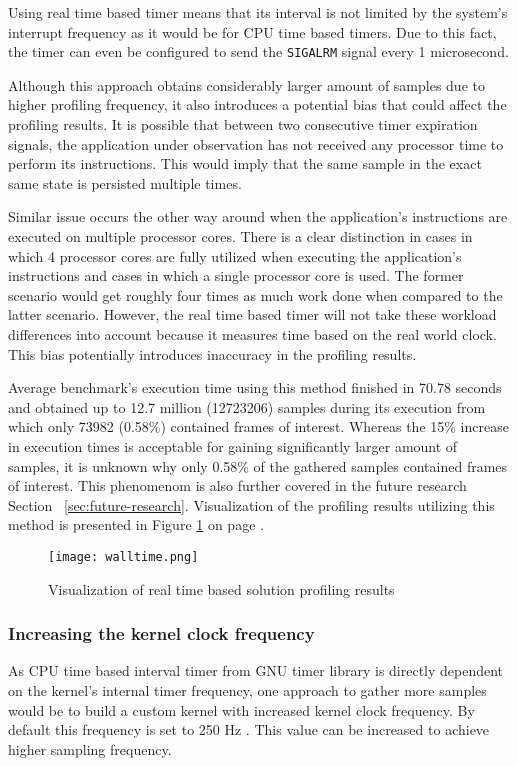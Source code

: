 \documentclass[..thesis.tex]{subfiles}
\begin{document}
Using real time based timer means that its interval is not limited by the system's interrupt frequency as it would be for CPU time based timers. Due to this fact, the timer can even be configured to send the \texttt{SIGALRM} signal every 1 microsecond.

Although this approach obtains considerably larger amount of samples due to higher profiling frequency, it also introduces a potential bias that could affect the profiling results. It is possible that between two consecutive timer expiration signals, the application under observation has not received any processor time to perform its instructions. This would imply that the same sample in the exact same state is persisted multiple times. 

Similar issue occurs the other way around when the application's instructions are executed on multiple processor cores. There is a clear distinction in cases in which 4 processor cores are fully utilized when executing the application's instructions and cases in which a single processor core is used. The former scenario would get roughly four times as much work done when compared to the latter scenario. However, the real time based timer will not take these workload differences into account because it measures time based on the real world clock. This bias potentially introduces inaccuracy in the profiling results.

Average benchmark's execution time using this method finished in 70.78 seconds and obtained up to 12.7 million (12723206) samples during its execution from which only 73982 (0.58\%) contained frames of interest. Whereas the 15\% increase in execution times is acceptable for gaining significantly larger amount of samples, it is unknown why only 0.58\% of the gathered samples contained frames of interest. This phenomenom is also further covered in the future research Section ~\ref{sec:future-research}. Visualization of the profiling results utilizing this method is presented in Figure \ref{fig:walltime} on page \pageref{fig:walltime}.
\begin{figure}[H]
\texttt{[image: walltime.png]}
\caption{Visualization of real time based solution profiling results}
\label{fig:walltime}
\end{figure}

\subsubsection{Increasing the kernel clock frequency}
\label{kernel-clock}
As CPU time based interval timer from GNU timer library is directly dependent on the kernel's internal timer frequency, one approach to gather more samples would be to build a custom kernel with increased kernel clock frequency. By default this frequency is set to 250 Hz \cite{torvalds_linux:_2018}. This value can be increased to achieve higher sampling frequency. 
\end{document}
